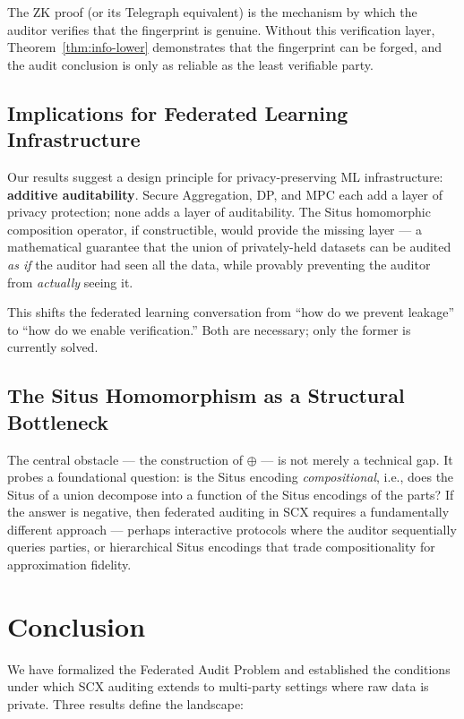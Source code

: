 \documentclass[12pt,a4paper]{article}
\newcommand{\ZK}{\mathrm{ZK}}
\begin{document}
The $\ZK$ proof (or its Telegraph equivalent) is the mechanism by which the
auditor verifies that the fingerprint is genuine.  Without this verification
layer, Theorem~\ref{thm:info-lower} demonstrates that the fingerprint can
be forged, and the audit conclusion is only as reliable as the least
verifiable party.

\subsection{Implications for Federated Learning Infrastructure}

Our results suggest a design principle for privacy-preserving ML
infrastructure: \textbf{additive auditability}.  Secure Aggregation, DP, and
MPC each add a layer of privacy protection; none adds a layer of
auditability.  The Situs homomorphic composition operator, if constructible,
would provide the missing layer — a mathematical guarantee that the union of
privately-held datasets can be audited \emph{as if} the auditor had seen
all the data, while provably preventing the auditor from \emph{actually}
seeing it.

This shifts the federated learning conversation from ``how do we prevent
leakage'' to ``how do we enable verification.''  Both are necessary; only
the former is currently solved.

\subsection{The Situs Homomorphism as a Structural Bottleneck}

The central obstacle — the construction of $\oplus$ — is not merely a
technical gap.  It probes a foundational question: is the Situs encoding
\emph{compositional}, i.e., does the Situs of a union decompose into a
function of the Situs encodings of the parts?  If the answer is negative,
then federated auditing in SCX requires a fundamentally different approach
— perhaps interactive protocols where the auditor sequentially queries
parties, or hierarchical Situs encodings that trade compositionality for
approximation fidelity.

\section{Conclusion}

We have formalized the Federated Audit Problem and established the conditions
under which SCX auditing extends to multi-party settings where raw data is
private.  Three results define the landscape:
\end{document}
